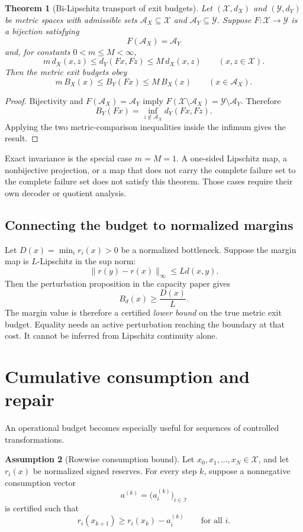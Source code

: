 \documentclass[11pt]{article}
\newtheorem{theorem}{Theorem}[section]
\theoremstyle{definition}
\newtheorem{assumption}[theorem]{Assumption}
\theoremstyle{remark}
\newcommand{\cA}{\mathcal A}
\newcommand{\cI}{\mathcal I}
\newcommand{\cX}{\mathcal X}
\newcommand{\cY}{\mathcal Y}
\begin{document}
\begin{theorem}[Bi-Lipschitz transport of exit budgets]
\label{thm:transport}
Let \((\cX,d_X)\) and \((\cY,d_Y)\) be metric spaces with admissible sets
\(\cA_X\subseteq\cX\) and \(\cA_Y\subseteq\cY\).  Suppose
\(F:\cX\to\cY\) is a bijection satisfying
\[
 F(\cA_X)=\cA_Y
\]
and, for constants \(0<m\le M<\infty\),
\[
 m\,d_X(x,z)
 \le
 d_Y(Fx,Fz)
 \le
 M\,d_X(x,z)
 \qquad(x,z\in\cX).
\]
Then the metric exit budgets obey
\[
 m\,B_X(x)
 \le
 B_Y(Fx)
 \le
 M\,B_X(x)
 \qquad(x\in\cA_X).
\]
\end{theorem}

\begin{proof}
Bijectivity and \(F(\cA_X)=\cA_Y\) imply
\(F(\cX\setminus\cA_X)=\cY\setminus\cA_Y\).  Therefore
\[
 B_Y(Fx)
 =
 \inf_{z\notin\cA_X}d_Y(Fx,Fz).
\]
Applying the two metric-comparison inequalities inside the infimum gives
the result.
\end{proof}

Exact invariance is the special case \(m=M=1\).  A one-sided Lipschitz map,
a nonbijective projection, or a map that does not carry the complete
failure set to the complete failure set does not satisfy this theorem.
Those cases require their own decoder or quotient analysis.

\subsection{Connecting the budget to normalized margins}

Let \(D(x)=\min_i r_i(x)>0\) be a normalized bottleneck.  Suppose the margin
map is \(L\)-Lipschitz in the sup norm:
\[
 \|r(y)-r(x)\|_\infty\le Ld(x,y).
\]
Then the perturbation proposition in the capacity paper gives
\[
 B_d(x)\ge\frac{D(x)}{L}.
\]
The margin value is therefore a certified \emph{lower bound} on the true
metric exit budget.  Equality needs an active perturbation reaching the
boundary at that cost.  It cannot be inferred from Lipschitz continuity
alone.

\section{Cumulative consumption and repair}
\label{sec:consumption}

An operational budget becomes especially useful for sequences of
controlled transformations.

\begin{assumption}[Rowwise consumption bound]
\label{ass:consumption}
Let \(x_0,x_1,\ldots,x_N\in\cX\), and let
\(r_i(x)\) be normalized signed reserves.  For every step \(k\), suppose a
nonnegative consumption vector
\[
 a^{(k)}=\bigl(a_i^{(k)}\bigr)_{i\in\cI}
\]
is certified such that
\[
 r_i(x_{k+1})
 \ge
 r_i(x_k)-a_i^{(k)}
 \qquad
 \text{for all }i.
\]
\end{assumption}
\end{document}
